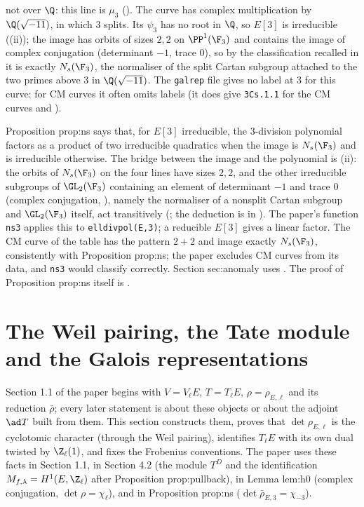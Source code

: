 \begin{example}
not over $\Q$: this line is $\mu_3$ (). The curve  has complex multiplication by $\Q(\sqrt{-11})$, in which $3$ splits. Its
$\psi_3$ has no root in $\Q$, so $E[3]$ is irreducible ((ii)); the image has orbits of sizes $2,2$ on $\PP^1(\F_3)$ and contains the image of complex
conjugation (determinant $-1$, trace $0$), so by the classification recalled in  it is exactly $N_s(\F_3)$, the normaliser of the split Cartan subgroup
attached to the two primes above $3$ in $\Q(\sqrt{-11})$. The \texttt{galrep} file gives no label at $3$ for this curve: for CM curves it often omits labels (it
does give \texttt{3Cs.1.1} for the CM curves  and ).
\end{example}

\begin{paperlink}\label{pl:ellcurves:ns}
Proposition prop:ns says that, for $E[3]$ irreducible, the $3$-division polynomial factors as a product of two irreducible quadratics when the image is $N_s(\F_3)$
and is irreducible otherwise. The bridge between the image and the polynomial is (ii): the orbits of $N_s(\F_3)$ on the four lines have sizes
$2,2$, and the other irreducible subgroups of $\GL_2(\F_3)$ containing an element of determinant $-1$ and trace $0$ (complex conjugation,
), namely the normaliser of a nonsplit Cartan subgroup and $\GL_2(\F_3)$ itself, act transitively (; the
deduction is in ). The paper's function \texttt{ns3} applies this to \texttt{elldivpol(E,3)}; a reducible $E[3]$ gives a linear factor. The CM curve  of the
table has the pattern $2+2$ and image exactly $N_s(\F_3)$, consistently with Proposition prop:ns; the paper excludes CM curves from its data, and \texttt{ns3}
would classify  correctly. Section sec:anomaly uses . The proof of Proposition prop:ns itself is .
\end{paperlink}
\section[The Weil pairing, Tate modules, Galois representations]{The Weil pairing, the Tate module and the Galois representations}\label{sec:ellcurves:weil}

Section 1.1 of the paper begins with $V=V_\ell E$, $T=T_\ell E$, $\rho=\rho_{E,\ell}$ and its reduction $\bar\rho$; every later statement is about these
objects or about the adjoint $\ad T$ built from them. This section constructs them, proves that $\det\rho_{E,\ell}$ is the cyclotomic character
(through the Weil pairing), identifies $T_\ell E$ with its own dual twisted by $\Z_\ell(1)$, and fixes the Frobenius conventions. The paper uses these facts in
Section 1.1, in Section 4.2 (the module $T^D$ and the identification $M_{f,\lambda}=H^1(E,\Z_\ell)$ after Proposition prop:pullback), in Lemma lem:h0 (complex
conjugation, $\det\rho=\chi_\ell$), and in Proposition prop:ns ($\det\bar\rho_{E,3}=\chi_{-3}$).

